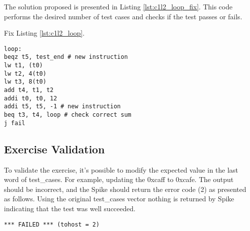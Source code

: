 The solution proposed is presented in Listing \ref{lst:c1l2_loop_fix}. This code performs the desired number of test cases and checks if the test passes or fails.

\begin{listing}[h]
\caption{Fix Listing \ref{lst:c1l2_loop}.}
\label{lst:c1l2_loop_fix}
\begin{verbatim}
loop:
beqz t5, test_end # new instruction
lw t1, (t0)
lw t2, 4(t0)
lw t3, 8(t0)
add t4, t1, t2
addi t0, t0, 12
addi t5, t5, -1 # new instruction
beq t3, t4, loop # check correct sum
j fail
\end{verbatim}
\end{listing}

\subsection{Exercise Validation}

To validate the exercise, it's possible to modify the expected value in the last word of test\_cases. For example, updating the 0xcaff to 0xcafe. The output should be incorrect, and the Spike should return the error code (2) as presented as follows. Using the original test\_cases vector nothing is returned by Spike indicating that the test was well succeeded.

\begin{listing}[h]
\begin{verbatim}
*** FAILED *** (tohost = 2)
\end{verbatim}
\end{listing}
